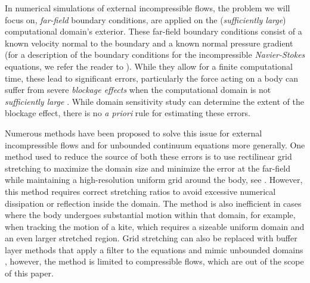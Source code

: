 \documentclass{article}
\begin{document}
In numerical simulations of external incompressible flows, the problem we will focus on, \emph{far-field} boundary conditions, are applied on the (\emph{sufficiently large}) computational domain's exterior. These far-field boundary conditions consist of a known velocity normal to the boundary and a known normal pressure gradient (for a description of the boundary conditions for the incompressible \emph{Navier-Stokes} equations, we refer the reader to \cite{Gresho1987}). While they allow for a finite computational time, these lead to significant errors, particularly the force acting on a body can suffer from severe \emph{blockage effects} when the computational domain is not \emph{sufficiently large} \cite{Colonius2008}. While domain sensitivity study can determine the extent of the blockage effect, there is no \emph{a priori} rule for estimating these errors.

Numerous methods have been proposed to solve this issue for external incompressible flows and for unbounded continuum equations more generally. One method used to reduce the source of both these errors is to use rectilinear grid stretching to maximize the domain size and minimize the error at the far-field while maintaining a high-resolution uniform grid around the body, see \cite{Maertens2015, Lauber2022}. However, this method requires correct stretching ratios to avoid excessive numerical dissipation or reflection inside the domain. The method is also inefficient in cases where the body undergoes substantial motion within that domain, for example, when tracking the motion of a kite, which requires a sizeable uniform domain and an even larger stretched region. Grid stretching can also be replaced with buffer layer methods that apply a filter to the equations and mimic unbounded domains \cite{Colonius2002ADomains}, however, the method is limited to compressible flows, which are out of the scope of this paper.
\end{document}
